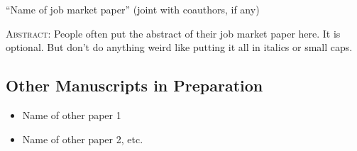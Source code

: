 \documentclass[12pt]{safecv}%
\begin{document}
``Name of job market paper'' (joint with coauthors, if any)

\vspace{\itemsep}

\textsc{Abstract}: People often put the abstract of their job market
paper here. It is optional. But don't do anything weird like putting
it all in italics or small caps.
  
\subsection*{Other Manuscripts in Preparation}
\begin{itemize}
\item Name of other paper 1
\item Name of other paper 2, etc.
\end{itemize}

\end{document}
